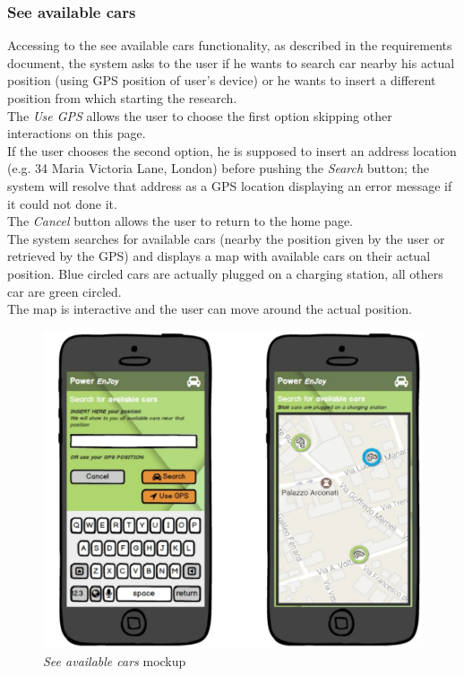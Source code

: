 \subsubsection{See available cars}
Accessing to the see available cars functionality, as described in the requirements document, the system asks to the user if he wants to search car nearby his actual position (using GPS position of user's device) or he wants to insert a different position from which starting the research. \\

The \emph{Use GPS} allows the user to choose the first option skipping other interactions on this page. \\

If the user chooses the second option, he is supposed to insert an address location (e.g. 34 Maria Victoria Lane, London) before pushing the \emph{Search} button; the system will resolve that address as a GPS location displaying an error message if it could not done it. \\

The \emph{Cancel} button allows the user to return to the home page. \\

The system searches for available cars (nearby the position given by the user or retrieved by the GPS) and displays a map with available cars on their actual position. Blue circled cars are actually plugged on a charging station, all others car are green circled.\\

The map is interactive and the user can move around the actual position. \\

	\begin{figure}[h]
			\centering
			\includegraphics[width=0.9\linewidth]{mockups/findCar}
			\caption{
				\label{fig:searchCar} 
				\emph{See available cars} mockup
			}
		\end{figure}

